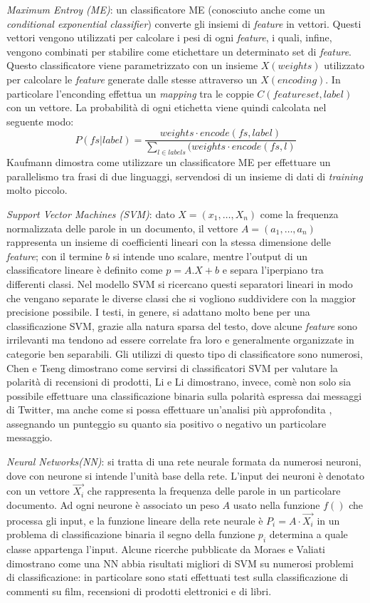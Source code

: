 \documentclass[a4paper,12pt,openright,twoside]{report}
\theoremstyle{definition}
\begin{document}
\emph{Maximum Entroy (ME)}: un classificatore ME (conosciuto  anche come un \emph{conditional exponential classifier})
converte gli insiemi di \emph{feature} in vettori. Questi vettori vengono utilizzati per calcolare i pesi
di ogni \emph{feature}, i quali, infine, vengono combinati per stabilire come etichettare un determinato
set di \emph{feature}. Questo classificatore viene parametrizzato con un insieme $X(weights)$ utilizzato per 
calcolare le \emph{feature} generate dalle stesse attraverso un $X(encoding)$. In 
particolare l'enconding effettua un \emph{mapping} tra le coppie $C(featureset,label)$ con un vettore. La
probabilità di ogni etichetta viene quindi calcolata nel seguente modo:
\begin{equation}
	P(fs|label)=\frac{weights \cdot encode(fs,label)}{\sum\nolimits_{l\in labels}(weights \cdot encode(fs,l)}
	\label{ME}
\end{equation}
Kaufmann %
dimostra come utilizzare un classificatore ME per effettuare un parallelismo tra frasi di due linguaggi,
 servendosi
di un insieme di dati di \emph{training} molto piccolo.

\emph{Support Vector Machines (SVM)}: dato $X=(x_1,\dots, X_n)$ come la frequenza normalizzata delle parole
in un documento, il vettore $A=(a_1,\dots,a_n)$ rappresenta un insieme di coefficienti lineari con la
stessa dimensione delle \emph{feature}; con il termine $b$ si intende uno scalare, 
mentre l'output di un classificatore
lineare è definito come $p=A.X + b$ e separa l'iperpiano tra differenti classi.
Nel modello SVM si ricercano questi separatori lineari in modo che vengano separate le diverse classi che si
vogliono suddividere con la maggior precisione possibile.
I testi, in genere, si adattano molto bene per una classificazione SVM, grazie alla natura sparsa del testo, dove
alcune \emph{feature} sono irrilevanti ma tendono ad essere correlate fra loro e generalmente organizzate
in categorie ben separabili.
Gli utilizzi di questo tipo di classificatore sono numerosi, Chen e Tseng %
dimostrano come servirsi di classificatori SVM per valutare la polarità di recensioni di prodotti,
Li e Li %
dimostrano, invece, comè non solo sia possibile effettuare una classificazione binaria sulla polarità espressa
dai messaggi di Twitter, ma anche come si possa effettuare un'analisi più approfondita
, assegnando un punteggio
su quanto sia positivo o negativo un particolare messaggio.

\emph{Neural Networks(NN)}: si tratta di una rete neurale formata da numerosi neuroni, dove con neurone si intende l'unità
base della rete. L'input dei neuroni è denotato con un vettore $\vec{X_i}$ che rappresenta la frequenza
delle parole in un particolare documento. Ad ogni neurone è associato un peso $A$ usato nella funzione $f()$
che processa gli input, e la funzione lineare della rete neurale è $P_i = A\cdot \vec{X_i}$ in un problema
di classificazione binaria il segno della funzione $p_i$ determina a quale classe appartenga l'input.
Alcune ricerche pubblicate da Moraes e Valiati %
dimostrano come una NN abbia risultati migliori di SVM su numerosi problemi di classificazione: in particolare
sono stati effettuati test sulla classificazione di commenti su film, recensioni di prodotti elettronici e di libri.
\end{document}
